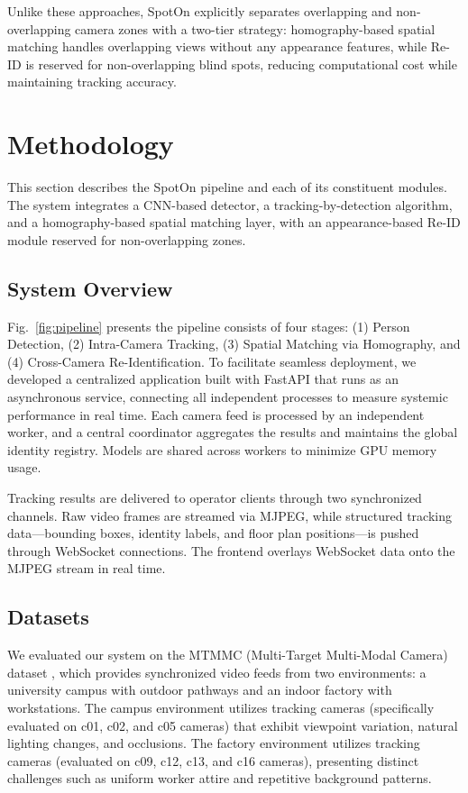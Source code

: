 \documentclass[conference]{IEEEtran}
\begin{document}
Unlike these approaches, SpotOn explicitly separates overlapping and non-overlapping camera zones with a two-tier strategy: homography-based spatial matching handles overlapping views without any appearance features, while Re-ID is reserved for non-overlapping blind spots, reducing computational cost while maintaining tracking accuracy.



\section{Methodology}
\label{sec:methodology}

This section describes the SpotOn pipeline and each of its constituent modules. The system integrates a CNN-based detector, a tracking-by-detection algorithm, and a homography-based spatial matching layer, with an appearance-based Re-ID module reserved for non-overlapping zones.

\subsection{System Overview}
\label{subsec:system-overview}

Fig.~\ref{fig:pipeline} presents the pipeline consists of four stages: (1) Person Detection, (2) Intra-Camera Tracking, (3) Spatial Matching via Homography, and (4) Cross-Camera Re-Identification. To facilitate seamless deployment, we developed a centralized application built with FastAPI that runs as an asynchronous service, connecting all independent processes to measure systemic performance in real time. Each camera feed is processed by an independent worker, and a central coordinator aggregates the results and maintains the global identity registry. Models are shared across workers to minimize GPU memory usage.

Tracking results are delivered to operator clients through two synchronized channels. Raw video frames are streamed via MJPEG, while structured tracking data---bounding boxes, identity labels, and floor plan positions---is pushed through WebSocket connections. The frontend overlays WebSocket data onto the MJPEG stream in real time.


\subsection{Datasets}
\label{subsec:datasets}

We evaluated our system on the MTMMC (Multi-Target Multi-Modal Camera) dataset \cite{mtmmc}, which provides synchronized video feeds from two environments: a university campus with outdoor pathways and an indoor factory with workstations. The campus environment utilizes tracking cameras (specifically evaluated on c01, c02, and c05 cameras) that exhibit viewpoint variation, natural lighting changes, and occlusions. The factory environment utilizes tracking cameras (evaluated on c09, c12, c13, and c16 cameras), presenting distinct challenges such as uniform worker attire and repetitive background patterns.
\end{document}
